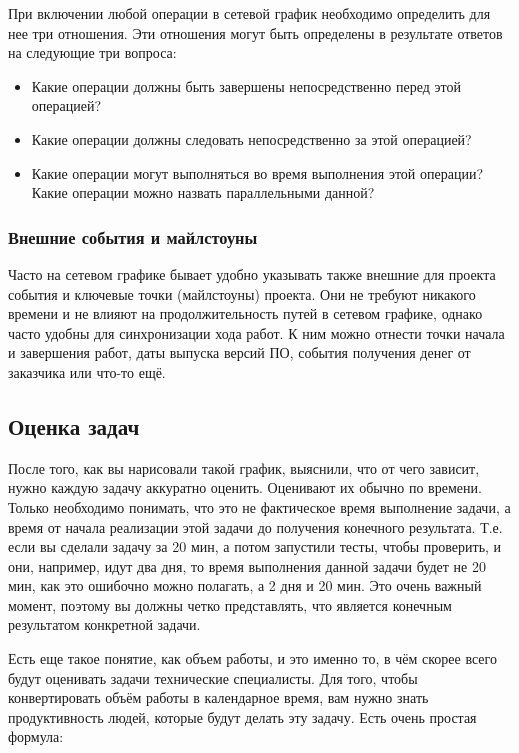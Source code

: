 \documentclass{../../text-style}
\begin{document}
При включении любой операции в сетевой график необходимо определить для нее три отношения. Эти отношения могут быть определены в результате ответов на следующие три вопроса:

\begin{itemize}
    \item Какие операции должны быть завершены непосредственно перед этой операцией?
    \item Какие операции должны следовать непосредственно за этой операцией?
    \item Какие операции могут выполняться во время выполнения этой операции? Какие операции можно назвать параллельными данной?
\end{itemize}

\subsubsection{Внешние события и майлстоуны}

Часто на сетевом графике бывает удобно указывать также внешние для проекта события и ключевые точки (майлстоуны) проекта. Они не требуют никакого времени и не влияют на продолжительность путей в сетевом графике, однако часто удобны для синхронизации хода работ. К ним можно отнести точки начала и завершения работ, даты выпуска версий ПО, события получения денег от заказчика или что-то ещё.

\subsection{Оценка задач}

После того, как вы нарисовали такой график, выяснили, что от чего зависит, нужно каждую задачу аккуратно оценить. Оценивают их обычно по времени. Только необходимо понимать, что это не фактическое время выполнение задачи, а время от начала реализации этой задачи до получения конечного результата. Т.е. если вы сделали задачу за 20 мин, а потом запустили тесты, чтобы проверить, и они, например, идут два дня, то время выполнения данной задачи будет не 20 мин, как это ошибочно можно полагать, а 2 дня и 20 мин. Это очень важный момент, поэтому вы должны четко представлять, что является конечным результатом конкретной задачи.

Есть еще такое понятие, как объем работы, и это именно то, в чём скорее всего будут оценивать задачи технические специалисты. Для того, чтобы конвертировать объём работы в календарное время, вам нужно знать продуктивность людей, которые будут делать эту задачу. Есть очень простая формула:
\end{document}
